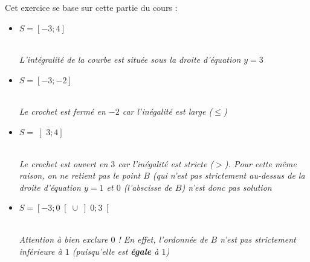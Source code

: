 \begin{corrige}
     Cet exercice se base sur cette partie du cours : 
     \begin{itemize}
          \item
          $S=\left[-3 ; 4\right]$
          \begin{center}
          \end{center} 
\\
          \textit{L'intégralité de la courbe est située sous la droite d'équation $y=3$}
\par
          \item
          $S=\left[-3 ; -2\right]$
          \begin{center}
          \end{center} 
\\
          \textit{Le crochet est fermé en $-2$ car l'inégalité est large ($\leqslant $)}
\par
          \item
          $S=\left] 3 ; 4\right]$
          \begin{center}
          \end{center} 
\\
          \textit{Le crochet est ouvert en $3$ car l'inégalité est stricte ($ > $). Pour cette même raison, on ne retient pas le point $B$ (qui n'est pas strictement au-dessus de la droite d'équation $y=1$ et $0$ (l'abscisse de $B$) n'est donc pas solution} 
          \item
          $S=\left[-3 ; 0\right[ \cup \left]0 ; 3\right[$
          \begin{center}
          \end{center} 
\\
          \textit{Attention à bien exclure $0$ ! En effet, l'ordonnée de $B$ n'est pas strictement inférieure à $1$ (puisqu'elle est \textbf{égale} à $1$)}
     \end{itemize}
\end{corrige}



